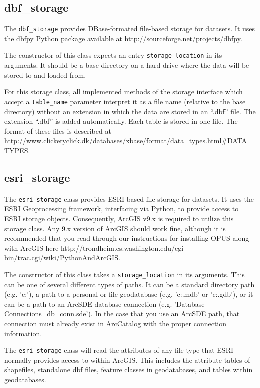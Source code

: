 {\subsection{dbf_storage}
%
The \verb|dbf_storage| provides DBase-formated file-based storage for
datasets.  It uses the dbfpy Python package available at
\url{http://sourceforge.net/projects/dbfpy}.

The constructor of this class expects an entry \verb|storage_location| in its
arguments. It should be a base directory on a hard drive where
the data will be stored to and loaded from.

For this storage class, all implemented methods of the storage interface which
accept a \verb|table_name| parameter interpret it as a file name (relative to the
base directory) without an extension in which the data are stored in an ``.dbf''
file.  The extension ``.dbf'' is added automatically. Each table is stored in one
file. The format of these files is described at
\url{http://www.clicketyclick.dk/databases/xbase/format/data_types.html\#DATA_TYPES}.

\subsection{esri_storage}
%
The \verb|esri_storage| class provides ESRI-based file storage for datasets.  It uses the 
ESRI Geoprocessing framework, interfacing via Python, to provide access to ESRI storage
objects.  Consequently, ArcGIS v9.x is required to utilize this storage class.  Any 9.x version
of ArcGIS should work fine, although it is recommended that you read through our instructions
for installing OPUS along with ArcGIS here http://trondheim.cs.washington.edu/cgi-bin/trac.cgi/wiki/PythonAndArcGIS.

The constructor of this class takes a \verb|storage_location| in its arguments.  This
can be one of several different types of paths.  It can be a standard directory path (e.g. 
'c:\temp'), a path to a personal or file geodatabase (e.g. 'c:\temp\mydb.mdb' or 'c:\temp\mydb.gdb'), or
it can be a path to an ArcSDE database connection (e.g. 'Database Connections\your_db_conn.sde').
In the case that you use an ArcSDE path, that connection must already exist in ArcCatalog with the 
proper connection information.

The \verb|esri_storage| class will read the attributes of any file type that ESRI normally provides 
access to within ArcGIS.  This includes the attribute tables of shapefiles, standalone
dbf files, feature classes in geodatabases, and tables within geodatabases.

}
